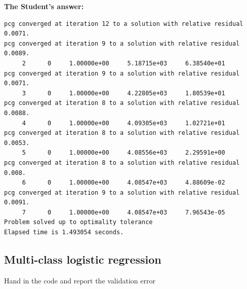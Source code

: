 \documentclass{article}
\begin{document}
\textbf{The Student's answer:}
\begin{verbatim}
pcg converged at iteration 12 to a solution with relative residual 0.0071.
pcg converged at iteration 9 to a solution with relative residual 0.0089.
     2      0     1.00000e+00     5.18715e+03     6.38540e+01
pcg converged at iteration 9 to a solution with relative residual 0.0071.
     3      0     1.00000e+00     4.22805e+03     1.80539e+01
pcg converged at iteration 8 to a solution with relative residual 0.0088.
     4      0     1.00000e+00     4.09305e+03     1.02721e+01
pcg converged at iteration 8 to a solution with relative residual 0.0053.
     5      0     1.00000e+00     4.08556e+03     2.29591e+00
pcg converged at iteration 8 to a solution with relative residual 0.008.
     6      0     1.00000e+00     4.08547e+03     4.88609e-02
pcg converged at iteration 9 to a solution with relative residual 0.0091.
     7      0     1.00000e+00     4.08547e+03     7.96543e-05
Problem solved up to optimality tolerance
Elapsed time is 1.493054 seconds.
\end{verbatim}

\subsection{Multi-class logistic regression}
\label{sec:multi-class-logistic}

Hand in the code and report the validation error
\end{document}

